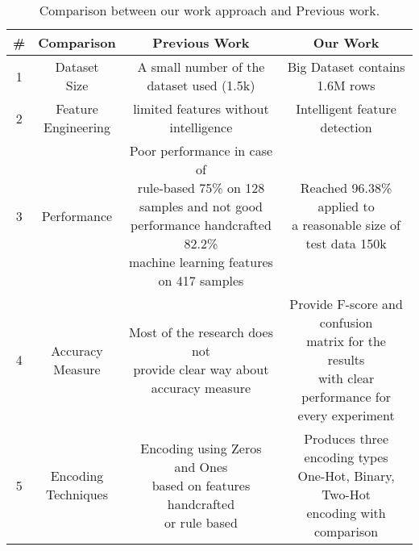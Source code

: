 \begin{table}[!t]
  \centering
  \begin{tabular}{c c c c}
    \hline
    \textbf{\#} & \textbf{Comparison} & \textbf{Previous Work} & \textbf{Our Work} \\
    \hline
    1 & \makecell{Dataset\\Size} & A small number of the dataset used (1.5k) & Big Dataset contains 1.6M rows    \\
        \hline
    2 & \makecell{Feature\\Engineering} & limited features without intelligence  & Intelligent feature detection   \\
        \hline
    3 & Performance & \makecell{Poor performance in case of\\ rule-based 75\% on 128 samples and not good \\performance handcrafted 82.2\% \\machine learning features on 417 samples}  & \makecell{Reached 96.38\% applied to \\a reasonable size of test data 150k}  \\

    \hline
        4 & \makecell{Accuracy\\Measure} & \makecell{Most of the research does not \\provide clear way about \\accuracy measure }  & \makecell{Provide F-score and confusion\\ matrix for the results\\ with clear performance for\\ every experiment}  \\

    \hline
    5 & \makecell{Encoding\\Techniques} & \makecell{Encoding using Zeros and Ones \\ based on features handcrafted \\or rule based }    & \makecell{Produces three encoding types\\  One-Hot, Binary, Two-Hot \\encoding with comparison }  \\

    \hline
 \end{tabular}
  \caption{Comparison between our work approach and Previous work. }\label{Tab:Comparison_Ours_Vs_Others}
\end{table}



